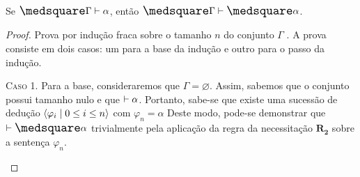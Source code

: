     \begin{theorem}\label{gen-nec}
        Se $\nec\Gamma\entails\alpha$, então $\nec\Gamma\entails\nec\alpha$.

        \begin{proof}
            Prova por indução fraca sobre o tamanho $n$ do conjunto $\Gamma$ \citep{Troelstra}. A prova consiste em dois casos: um para a base da indução e outro para o passo da indução.

            \begin{case}
                \textsc{Caso 1.} Para a base, consideraremos que $\Gamma=\varnothing$.
                Assim, sabemos que o conjunto possui tamanho nulo e que $\mathrel{\vdash}\alpha$. Portanto, sabe-se que existe uma sucessão de dedução $\langle\varphi_i\mid 0\leq i\leq n\rangle$ com $\varphi_n=\alpha$
                Deste modo, pode-se demonstrar que $\entails\nec\alpha$ trivialmente pela aplicação da regra da necessitação \hyperref[necessitation]{$\mathbf{R_2}$} sobre a sentença $\varphi_n$.
            \end{case}


\end{proof}
\end{theorem}
